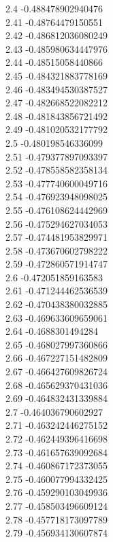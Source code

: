 {2.4	-0.488478902940476\\
2.41	-0.48764479150551\\
2.42	-0.486812036080249\\
2.43	-0.485980634447976\\
2.44	-0.48515058440866\\
2.45	-0.484321883778169\\
2.46	-0.483494530387527\\
2.47	-0.482668522082212\\
2.48	-0.481843856721492\\
2.49	-0.481020532177792\\
2.5	-0.480198546336099\\
2.51	-0.479377897093397\\
2.52	-0.478558582358134\\
2.53	-0.477740600049716\\
2.54	-0.476923948098025\\
2.55	-0.476108624442969\\
2.56	-0.475294627034053\\
2.57	-0.474481953829971\\
2.58	-0.473670602798222\\
2.59	-0.472860571914747\\
2.6	-0.472051859163583\\
2.61	-0.471244462536539\\
2.62	-0.470438380032885\\
2.63	-0.469633609659061\\
2.64	-0.4688301494284\\
2.65	-0.468027997360866\\
2.66	-0.467227151482809\\
2.67	-0.466427609826724\\
2.68	-0.465629370431036\\
2.69	-0.464832431339884\\
2.7	-0.464036790602927\\
2.71	-0.463242446275152\\
2.72	-0.462449396416698\\
2.73	-0.461657639092684\\
2.74	-0.460867172373055\\
2.75	-0.460077994332425\\
2.76	-0.459290103049936\\
2.77	-0.458503496609124\\
2.78	-0.457718173097789\\
2.79	-0.456934130607874\\
}
